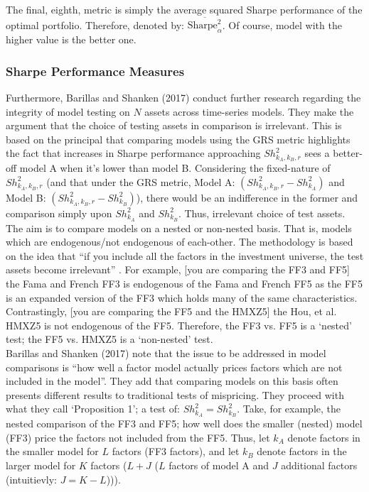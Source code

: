 \documentclass[11pt, english]{article}
\begin{document}
        The final, eighth, metric is simply the average squared Sharpe performance of the optimal portfolio. Therefore, denoted by: $\overline{\textrm{Sharpe}_{\alpha}^2}$. Of course, model with the higher value is the better one.

                \subsubsection*{Sharpe Performance Measures}

        Furthermore, Barillas and Shanken (2017) conduct further research regarding the integrity of model testing on $N$ assets across time-series models. They make the argument that the choice of testing assets in comparison is irrelevant. This is based on the principal that comparing models using the GRS metric highlights the fact that increases in Sharpe performance approaching $Sh_{k_{A},k_{B},r}^2$ sees a better-off model A when it's lower than model B. Considering the fixed-nature of $Sh_{k_{A},k_{B},r}^2$ (and that under the GRS metric, Model A: $(Sh_{k_{A},k_{B},r}^2-Sh_{k_{A}}^2)$ and Model B: $(Sh_{k_{A},k_{B},r}^2-Sh_{k_{B}}^2)$), there would be an indifference in the former and comparison simply upon $Sh_{k_{A}}^2$ and $Sh_{k_{B}}^2$. Thus, irrelevant choice of test assets.\\

        The aim is to compare models on a nested or non-nested basis. That is, models which are endogenous/not endogenous of each-other. The methodology is based on the idea that ``if you include all the factors in the investment universe, the test assets become irrelevant'' . For example, [you are comparing the FF3 and FF5] the Fama and French FF3 is endogenous of the Fama and French FF5 as the FF5 is an expanded version of the FF3 which holds many of the same characteristics. Contrastingly, [you are comparing the FF5 and the HMXZ5] the Hou, et al. HMXZ5 is not endogenous of the FF5. Therefore, the FF3 vs. FF5 is a `nested' test; the FF5 vs. HMXZ5 is a `non-nested' test.\\

	Barillas and Shanken (2017) note that the issue to be addressed in model comparisons is ``how well a factor model actually prices factors which are not included in the model''. They add that comparing models on this basis often presents different results to traditional tests of mispricing. They proceed with what they call `Proposition 1'; a test of: $Sh_{k_{A}}^2=Sh_{k_{B}}^2$. Take, for example, the nested comparison of the FF3 and FF5; how well does the smaller (nested) model (FF3) price the factors not included from the FF5. Thus, let $k_A$ denote factors in the smaller model for $L$ factors (FF3 factors), and let $k_B$ denote factors in the larger model for $K$ factors ($L+J$ ($L$ factors of model A and $J$ additional factors (intuitievly: $J=K-L$))).\\
\end{document}
